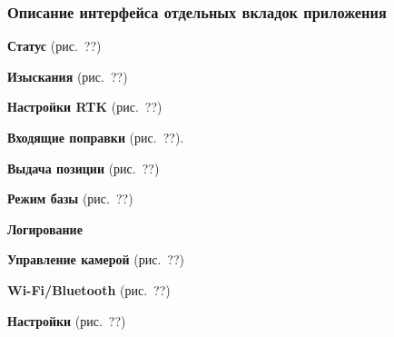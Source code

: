 \subsubsection{Описание интерфейса отдельных вкладок приложения}
\label{subsec:app-sketch-tabs}

\begin{dashitemize}
  \item \textbf{Статус} (рис.~??)

  \item \textbf{Изыскания} (рис.~??)

  \item \textbf{Настройки RTK} (рис.~??)

  \item \textbf{Входящие поправки} (рис.~??).

  \item \textbf{Выдача позиции} (рис.~??)

  \item \textbf{Режим базы} (рис.~??)

  \item \textbf{Логирование}

  \item \textbf{Управление камерой} (рис.~??)

  \item \textbf{Wi-Fi/Bluetooth} (рис.~??)

  \item \textbf{Настройки} (рис.~??)
\end{dashitemize}

\newpage
